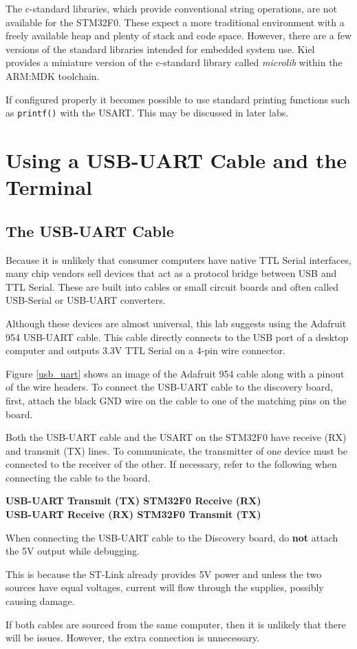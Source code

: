 \documentclass[11pt,fleqn]{book} %
\begin{document}
The c-standard libraries, which provide conventional string operations, are not available for the STM32F0. These expect a more traditional environment with a freely available heap and plenty of stack and code space. However, there are a few versions of the standard libraries intended for embedded system use. Kiel provides a miniature version of the c-standard library called \textit{microlib} within the ARM:MDK toolchain.

If configured properly it becomes possible to use standard printing functions such as \texttt{printf()} with the USART. This may be discussed in later labs. 


\section{Using a USB-UART Cable and the Terminal}
\subsection{The USB-UART Cable}
Because it is unlikely that consumer computers have native TTL Serial interfaces, many chip vendors sell devices that act as a protocol bridge between USB and TTL Serial. These are built into cables or small circuit boards and often called USB-Serial or USB-UART converters. 

Although these devices are almost universal, this lab suggests using the Adafruit 954 USB-UART cable. This cable directly connects to the USB port of a desktop computer and outputs 3.3V TTL Serial on a 4-pin wire connector. 

Figure \ref{usb_uart} shows an image of the Adafruit 954 cable along with a pinout of the wire headers. To connect the USB-UART cable to the discovery board, first, attach the black GND wire on the cable to one of the matching pins on the board. 

Both the USB-UART cable and the USART on the STM32F0 have receive (RX) and transmit (TX) lines. To communicate, the transmitter of one device must be connected to the receiver of the other. If necessary, refer to the following when connecting the cable to the board. \\

\parbox{\textwidth} {
    \centering
    \textbf{USB-UART Transmit (TX) \textrightarrow  STM32F0 Receive (RX) \\
    USB-UART Receive (RX) \textrightarrow  STM32F0 Transmit (TX)}
}
    

\begin{warning}
When connecting the USB-UART cable to the Discovery board, do \textbf{not} attach the 5V output while debugging. 

This is because the ST-Link already provides 5V power and unless the two sources have equal voltages, current will flow through the supplies, possibly causing damage. 

If both cables are sourced from the same computer, then it is unlikely that there will be issues. However, the extra connection is unnecessary.
\end{warning}
\end{document}
